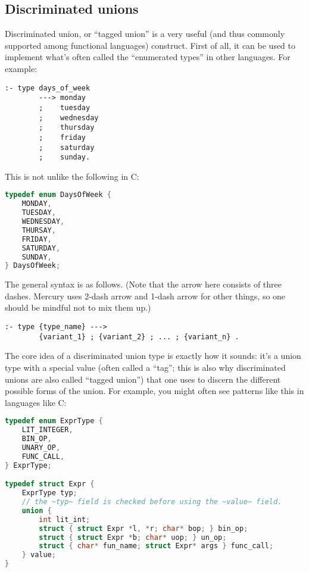 \subsection{Discriminated unions}

Discriminated union, or ``tagged union'' is a very useful (and thus commonly supported among functional languages) construct. First of all, it can be used to implement what's often called the ``enumerated types'' in other languages. For example:

\begin{lstlisting}[language=Mercury]
:- type days_of_week
        ---> monday
        ;    tuesday
        ;    wednesday
        ;    thursday
        ;    friday
        ;    saturday
        ;    sunday.
\end{lstlisting}

This is not unlike the following in C:

\begin{lstlisting}[language=C]
typedef enum DaysOfWeek {
    MONDAY,
    TUESDAY,
    WEDNESDAY,
    THURSAY,
    FRIDAY,
    SATURDAY,
    SUNDAY,
} DaysOfWeek;
\end{lstlisting}

  The general syntax is as follows. (Note that the arrow here consists of three dashes. Mercury uses 2-dash arrow and 1-dash arrow for other things, so one should be mindful not to mix them up.)
  
\begin{lstlisting}[language=Mercury]
:- type {type_name} --->
        {variant_1} ; {variant_2} ; ... ; {variant_n} .
\end{lstlisting}
  
The core idea of a discriminated union type is exactly how it sounds: it's a union type with a special value (often called a ``tag''; this is also why discriminated unions are also called ``tagged union'') that one uses to discern the different possible forms of the union. For example, you might often see patterns like this in languages like C:

\begin{lstlisting}[language=C]
typedef enum ExprType {
    LIT_INTEGER,
    BIN_OP,
    UNARY_OP,
    FUNC_CALL,
} ExprType;

typedef struct Expr {
    ExprType typ;
    // the ~typ~ field is checked before using the ~value~ field.
    union {
        int lit_int;
        struct { struct Expr *l, *r; char* bop; } bin_op;
        struct { struct Expr *b; char* uop; } un_op;
        struct { char* fun_name; struct Expr* args } func_call;
    } value;
}
\end{lstlisting}

